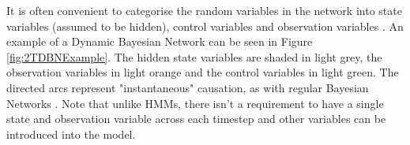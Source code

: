 It is often convenient to categorise the random variables in the network into state variables (assumed to be hidden), control variables and observation variables \cite{Thrun:2005:ProbabilisticRobotics}. An example of a Dynamic Bayesian Network can be seen in Figure \ref{fig:2TDBNExample}. The hidden state variables are shaded in light grey, the observation variables in light orange and the control variables in light green. The directed arcs represent "instantaneous" causation, as with regular Bayesian Networks \cite[p.~15]{Murphy1994DynamicLearning}. Note that unlike HMMs, there isn't a requirement to have a single state and observation variable across each timestep and other variables can be introduced into the model.













